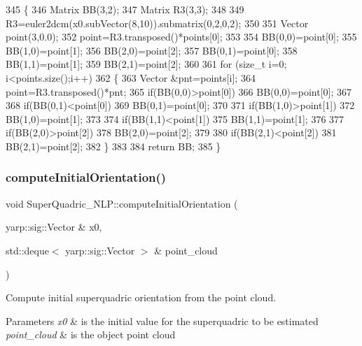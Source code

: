 \begin{DoxyCode}
345 \{
346     Matrix BB(3,2);
347     Matrix R3(3,3);
348 
349     R3=euler2dcm(x0.subVector(8,10)).submatrix(0,2,0,2);
350 
351     Vector point(3,0.0);
352     point=R3.transposed()*points[0];
353 
354     BB(0,0)=point[0];
355     BB(1,0)=point[1];
356     BB(2,0)=point[2];
357     BB(0,1)=point[0];
358     BB(1,1)=point[1];
359     BB(2,1)=point[2];
360 
361     \textcolor{keywordflow}{for} (\textcolor{keywordtype}{size\_t} i=0; i<points.size();i++)
362     \{
363         Vector &pnt=points[i];
364         point=R3.transposed()*pnt;
365         \textcolor{keywordflow}{if}(BB(0,0)>point[0])
366            BB(0,0)=point[0];
367 
368         \textcolor{keywordflow}{if}(BB(0,1)<point[0])
369             BB(0,1)=point[0];
370 
371         \textcolor{keywordflow}{if}(BB(1,0)>point[1])
372             BB(1,0)=point[1];
373 
374         \textcolor{keywordflow}{if}(BB(1,1)<point[1])
375             BB(1,1)=point[1];
376 
377         \textcolor{keywordflow}{if}(BB(2,0)>point[2])
378             BB(2,0)=point[2];
379 
380         \textcolor{keywordflow}{if}(BB(2,1)<point[2])
381             BB(2,1)=point[2];
382     \}
383 
384     \textcolor{keywordflow}{return} BB;
385 \}
\end{DoxyCode}
\mbox{\label{classSuperQuadric__NLP_a6fd9bdffb81bfdfec56bae2efd58c270}} 
\subsubsection{\texorpdfstring{compute\+Initial\+Orientation()}{computeInitialOrientation()}}
{\footnotesize\ttfamily void Super\+Quadric\+\_\+\+N\+L\+P\+::compute\+Initial\+Orientation (\begin{DoxyParamCaption}\item[{yarp\+::sig\+::\+Vector \&}]{x0,  }\item[{std\+::deque$<$ yarp\+::sig\+::\+Vector $>$ \&}]{point\+\_\+cloud }\end{DoxyParamCaption})\hspace{0.3cm}{\ttfamily [protected]}}



Compute initial superquadric orientation from the point cloud. 


\begin{DoxyParams}{Parameters}
{\em x0} & is the initial value for the superquadric to be estimated \\
\hline
{\em point\+\_\+cloud} & is the object point cloud \\
\hline
\end{DoxyParams}


